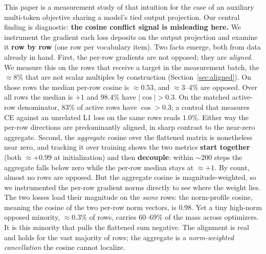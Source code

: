 This paper is a measurement study of that intuition for the case of an auxiliary
multi-token objective sharing a model's tied output projection. Our central
finding is diagnostic: \textbf{the cosine conflict signal is misleading here.} We
instrument the gradient each loss deposits on the output projection and examine
it \textbf{row by row} (one row per vocabulary item). Two facts emerge, both from
data already in hand. First, the per-row gradients are not opposed; they are \emph{aligned}. We measure this on the rows that receive a target in the measurement batch, the ${\approx}8\%$ that are not scalar multiples by construction (Section~\ref{sec:aligned}). On those rows the median per-row cosine is ${\approx}0.53$, and ${\approx}3$--$4\%$ are opposed. Over all rows the median is $+1$ and $98.4\%$ have $|\cos| > 0.3$. On the matched active-row denominator, $83\%$ of active rows have $\cos > 0.3$; a control that measures CE against an unrelated L1 loss on the same rows reads $1.0\%$. Either way the per-row directions are
predominantly aligned, in sharp contrast to the near-zero aggregate. Second,
the \emph{aggregate} cosine over the flattened matrix is nonetheless near zero,
and tracking it over training shows the two metrics \textbf{start together} (both
$\approx +0.99$ at initialization) and then \textbf{decouple}: within ${\sim}200$
steps the aggregate falls below zero while the per-row median stays at
$\approx +1$. By count, almost no rows are opposed. But the aggregate cosine is magnitude-weighted, so we instrumented the per-row gradient norms directly to see where the weight lies. The two losses load their magnitude on the \emph{same} rows: the norm-profile cosine, meaning the cosine of the two per-row norm vectors, is $0.98$. Yet a tiny high-norm opposed minority, ${\approx}0.3\%$ of rows, carries $60$--$69\%$ of the mass across optimizers. It is this minority that pulls the flattened sum negative. The
alignment is real and holds for the vast majority of rows; the aggregate is a
\emph{norm-weighted cancellation} the cosine cannot localize.

